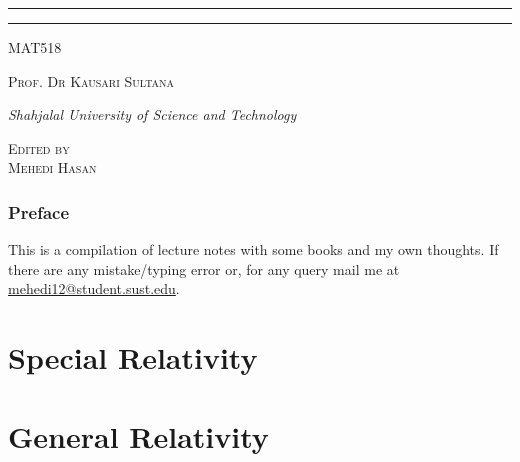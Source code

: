 \documentclass[12pt,oneside,reqno]{amsbook}
\newcommand{\course}{MAT518}
\newcommand{\prof}{Prof. Dr Kausari Sultana}
\begin{document}
\begin{titlepage}
\rule{345pt}{0.4pt}\vspace*{-\baselineskip}\vspace{3.2pt}
\rule{345pt}{1.6pt}

\vspace{2\baselineskip}

{\scshape \Large{\course}} 

\vspace*{5\baselineskip}



\vspace{0.5\baselineskip} 

{\scshape   \Large \prof\\ }

\vspace{0.75\baselineskip} 

{\textit{\large Shahjalal University of Science and Technology}} 

\vfill 

\vspace{0.3\baselineskip} 


{\scshape \large Edited by\\  Mehedi Hasan} 
\vspace*{40pt}
\end{titlepage}
\newpage
\section*{Preface}
This is a compilation of lecture notes with some books and my own thoughts. If there are any mistake/typing error or, for any query mail me at \href{mailto:mehedi12@student.sust.edu}{mehedi12@student.sust.edu}.
\newpage
\tableofcontents
\newpage
{}

% 
\part{Special Relativity}
\part{General Relativity}

\end{document}
